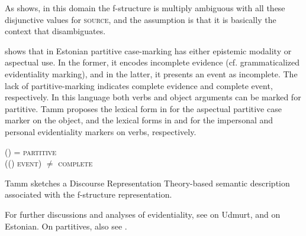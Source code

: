 \documentclass[output=paper,hidelinks]{langscibook}
\begin{document}
\ea%
    \label{ex:FinnoUgric:69}
    \z
As  shows, in this domain the f-structure is multiply ambiguous with all these disjunctive values for \textsc{source}, and the assumption is that it is basically the context that disambiguates.

\citet{Tamm2008} shows that in Estonian partitive case-marking has either epistemic modality or aspectual use. In the former, it encodes incomplete evidence (cf. grammaticalized evidentiality marking), and in the latter, it presents an event as incomplete. The lack of partitive-marking indicates complete evidence and complete event, respectively. In this language both verbs and object arguments can be marked for partitive. Tamm proposes the lexical form in  for the aspectual partitive case marker on the object, and the lexical forms in  and  for the impersonal and personal evidentiality markers on verbs, respectively.

\ea%
    \label{ex:FinnoUgric:70}
(\UP\CASE) = \textsc{partitive}\\
((\OBJ\UP) \textsc{event)} ${\neq}$ \textsc{complete}
    \z

\ea%
    \label{ex:FinnoUgric:71}
    \z

\ea%
    \label{ex:FinnoUgric:72}
\z
Tamm sketches a Discourse Representation Theory-based semantic description associated with the f-structure representation.

For further discussions and analyses of evidentiality, see \citet{Szabo2017} on Udmurt, and \citet{Tamm2004a,Tamm2012a} on Estonian. On partitives, also see \citet{Tamm2012b}.
\end{document}
